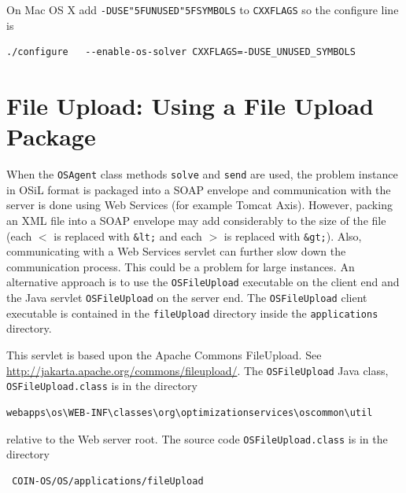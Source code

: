 \documentclass[11pt]{article}
\renewcommand{\_}{{\char"5F}}
\renewcommand{\{}{{\char"7B}}
\renewcommand{\}}{{\char"7D}}
\renewcommand{\^}{{\char"0D}}
\renewcommand{\'}{{\char"0D}}
\begin{document}
\begin{enumerate}[Step 1:]
 On Mac OS X add   {\tt -DUSE\_UNUSED\_SYMBOLS} to {\tt CXXFLAGS} so the configure line is

\begin{verbatim}
./configure   --enable-os-solver CXXFLAGS=-DUSE_UNUSED_SYMBOLS
\end{verbatim}






\section{File Upload:  Using a File Upload Package}\label{section:fileupload}

When the {\tt OSAgent}  class methods {\tt solve} and 
{\tt send} are used, the problem instance in OSiL format is packaged into 
a SOAP envelope and communication with the server is done using Web Services (for example Tomcat 
Axis). However, packing an XML file into a SOAP envelope may add considerably to the 
size of the file (each {\tt $<$} is replaced with {\tt \&lt;}  and each {\tt $>$} is replaced with {\tt \&gt;}). 
Also, communicating with a Web Services servlet can further slow down the communication process. 
This could be a problem for large instances. An alternative approach is to use the {\tt OSFileUpload} 
executable on the client end and the Java servlet {\tt OSFileUpload} on the server end.  The {\tt OSFileUpload} 
client executable is contained in the {\tt fileUpload}  directory inside the {\tt applications} directory.

This servlet is based upon the Apache Commons FileUpload. See \url{http://jakarta.apache.org/commons/fileupload/}. 
The {\tt OSFileUpload} Java class, {\tt OSFileUpload.class} is in the directory
\begin{verbatim}
webapps\os\WEB-INF\classes\org\optimizationservices\oscommon\util
\end{verbatim}
relative to the Web server root.  The source code {\tt OSFileUpload.class} is in the directory
\begin{verbatim}
 COIN-OS/OS/applications/fileUpload
 \end{verbatim}




\end{enumerate}
\end{document}

